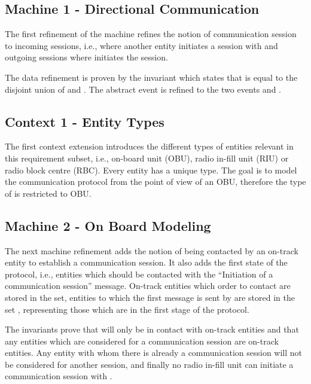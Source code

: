\documentclass{template/openetcs_article}
\begin{document}
\subsection{Machine 1 - Directional Communication}
\label{sec:mach-1-direct}

The first refinement of the machine refines the notion of communication session
to incoming sessions, i.e., where another entity initiates a session with
 and outgoing sessions where  initiates the
session.

The data refinement is proven by the invariant which states that 
is equal to the disjoint union of  and
. The abstract  event is
refined to the two events  and .



\subsection{Context 1 - Entity Types}
\label{sec:context-1-entity}

The first context extension introduces the different types of entities relevant
in this requirement subset, i.e., on-board unit (OBU), radio in-fill unit (RIU)
or radio block centre (RBC). Every entity has a unique type. The goal is to
model the communication protocol from the point of view of an OBU, therefore the
type of  is restricted to OBU.



\subsection{Machine 2 - On Board Modeling}
\label{sec:machine-2-board}

The next machine refinement adds the notion of being contacted by an on-track
entity to establish a communication session. It also adds the first state of the
protocol, i.e., entities which should be contacted with the ``Initiation of a
communication session'' message. On-track entities which order 
to contact are stored in the  set, entities to which the
first message is sent by  are stored in the set
, representing those which are in the first stage of the
protocol.

The invariants prove that  will only be in contact with
on-track entities and that any entities which are considered for a communication
session are on-track entities. Any entity with whom there is already a
communication session will not be considered for another session, and finally no
radio in-fill unit can initiate a communication session with .
\end{document}
